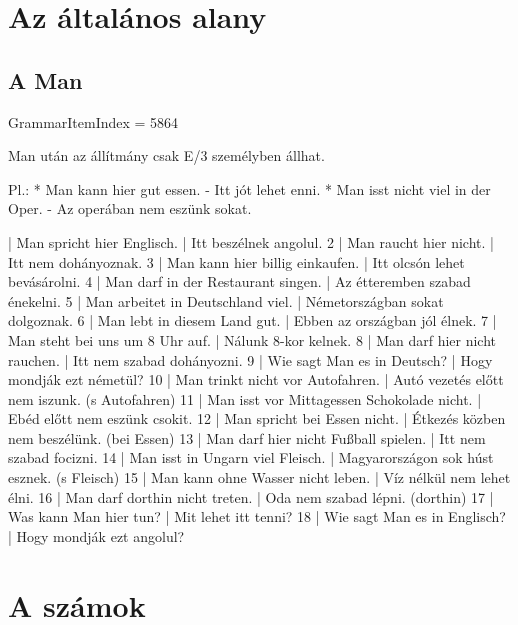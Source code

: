 \documentclass{article}
\newenvironment{desc}{\verbatim}{\endverbatim}
\newenvironment{exmp}{\verbatim}{\endverbatim}
\begin{document}
\begin{exmp}
\end{exmp}

\section{Az általános alany}

\subsection{A Man}

GrammarItemIndex = 5864

\begin{desc}
Man után az állítmány csak E/3 személyben állhat.

Pl.: * Man kann hier gut essen. - Itt jót lehet enni.
* Man isst nicht viel in der Oper. - Az operában nem eszünk sokat. 
\end{desc}

\begin{exmp}
1 | Man spricht hier Englisch. | Itt beszélnek angolul.
2 | Man raucht hier nicht. | Itt nem dohányoznak.
3 | Man kann hier billig einkaufen. | Itt olcsón lehet bevásárolni.
4 | Man darf in der Restaurant singen. | Az étteremben szabad énekelni.
5 | Man arbeitet in Deutschland viel. | Németországban sokat dolgoznak.
6 | Man lebt in diesem Land gut. | Ebben az országban jól élnek.
7 | Man steht bei uns um 8 Uhr auf. | Nálunk 8-kor kelnek.
8 | Man darf hier nicht rauchen. | Itt nem szabad dohányozni.
9 | Wie sagt Man es in Deutsch? | Hogy mondják ezt németül?
10 | Man trinkt nicht vor Autofahren. | Autó vezetés előtt nem iszunk. (s Autofahren)
11 | Man isst vor Mittagessen Schokolade nicht. | Ebéd előtt nem eszünk csokit.
12 | Man spricht bei Essen nicht. | Étkezés közben nem beszélünk. (bei Essen)
13 | Man darf hier nicht Fußball spielen. | Itt nem szabad focizni.
14 | Man isst in Ungarn viel Fleisch. | Magyarországon sok húst esznek. (s Fleisch)
15 | Man kann ohne Wasser nicht leben. | Víz nélkül nem lehet élni.
16 | Man darf dorthin nicht treten. | Oda nem szabad lépni. (dorthin)
17 | Was kann Man hier tun? | Mit lehet itt tenni?
18 | Wie sagt Man es in Englisch? | Hogy mondják ezt angolul?
\end{exmp}

\section{A számok}
\end{document}
